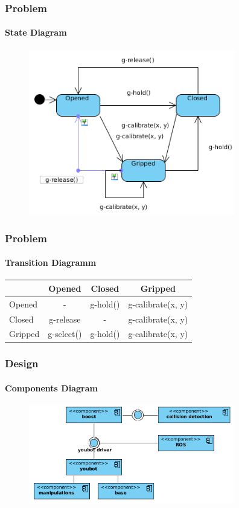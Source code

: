 \documentclass{beamer}
\begin{document}


\begin{frame}
 \frametitle{Problem}
 \framesubtitle{State Diagram}

 \begin{figure}[ht!]
  \centering
  \includegraphics[width=90mm]{img/statechart.png}
  \caption{}
  \label{State Diagram Of The Gripper}
  \end{figure} 
 \end{frame}
 
 
 \begin{frame}
 \frametitle{Problem}
 \framesubtitle{Transition Diagramm}

 \begin{tabular}{ l | c c c }
            & Opened & Closed & Gripped \\ \hline
  Opened    & - & g-hold() & g-calibrate(x, y) \\
  Closed    & g-release & - & g-calibrate(x, y) \\
  Gripped   & g-select() & g-hold() & g-calibrate(x, y)
  \end{tabular}

\end{frame}

\begin{frame}
 \frametitle{Design}
 \framesubtitle{Components Diagram}
  \begin{figure}[ht!]
  \centering
  \includegraphics[width=90mm]{img/components.png}
  \caption{}
  \label{Component Diagram}
  \end{figure} 
\end{frame}
\end{document}
